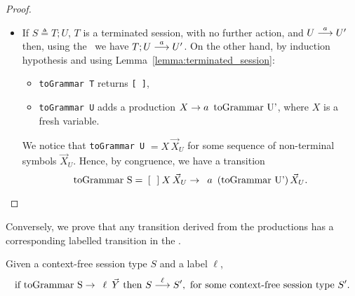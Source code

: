 \begin{proof}
\begin{itemize}
	\item If $S\triangleq T;U$, $T$ is a terminated session, with no further 
	      action, and $U \LTSderives[a] U'$ then, using the \LTS\ we have
	      $T;U \LTSderives[a] U'$. On the other hand, by induction hypothesis and 
	      using Lemma~\ref{lemma:terminated_session}:
	    \begin{itemize}
			\item \lstinline{toGrammar T}  returns \lstinline{[ ]},
			\item \lstinline{toGrammar U}  adds a production 
			$X \rightarrow a \enspace \text{\lstinline{toGrammar U'}}$, where $X$
			is a fresh variable.
		\end{itemize}
		We notice that \lstinline{toGrammar U} $= X \, \vec X_U$ for some sequence of 
		non-terminal symbols $\vec X_U$. Hence, by congruence, we have a 
		transition 
		\[\text{\lstinline{toGrammar S}} = \, \text{\lstinline{[ ]}} \, X \, 
		\vec X_U \rightarrow \enspace a \enspace \text{(\lstinline{toGrammar U'})} \, 
		\vec X_U.\]
\end{itemize}
\end{proof}

Conversely, we prove that any transition derived from the productions 
has a corresponding labelled transition in the \LTS.

\begin{lemma}
Given a context-free session type $S$ and a label $\ell$,
	\[ \text{if } \text{\lstinline{toGrammar S}} \rightarrow \enspace \ell \enspace 
	 \vec Y \text{ then } S \LTSderives[\ell] S', \text{ for some context-free session type $S'$}.\]
\end{lemma}

